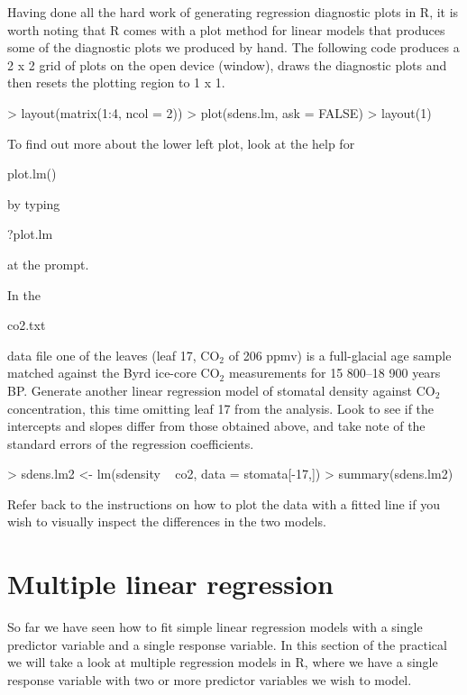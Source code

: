 \documentclass[letterpaper,10pt]{article}
\newenvironment{rline}{\begin{small}\begin{ttfamily}}{\end{ttfamily}\end{small}}
\begin{document}
Having done all the hard work of generating regression diagnostic plots in R, it is worth noting that R comes with a plot method for linear models that produces some of the diagnostic plots we produced by hand. The following code produces a 2 x 2 grid of plots on the open device (window), draws the diagnostic plots and then resets the plotting region to 1 x 1.

\begin{Schunk}
\begin{Sinput}
> layout(matrix(1:4, ncol = 2))
> plot(sdens.lm, ask = FALSE)
> layout(1)
\end{Sinput}
\end{Schunk}

To find out more about the lower left plot, look at the help for \begin{rline}plot.lm()\end{rline} by typing \begin{rline}?plot.lm\end{rline} at the prompt.

In the \begin{rline}co2.txt\end{rline} data file one of the leaves (leaf 17, $\mathrm{CO}_2$ of 206 ppmv) is a full-glacial age sample matched against the Byrd ice-core $\mathrm{CO}_2$ measurements for 15 800--18 900 years BP. Generate another linear regression model of stomatal density against $\mathrm{CO}_2$ concentration, this time omitting leaf 17 from the analysis. Look to see if the intercepts and slopes differ from those obtained above, and take note of the standard errors of the regression coefficients.

\begin{Schunk}
\begin{Sinput}
> sdens.lm2 <- lm(sdensity ~ co2, data = stomata[-17,])
> summary(sdens.lm2)
\end{Sinput}
\end{Schunk}

Refer back to the instructions on how to plot the data with a fitted line if you wish to visually inspect the differences in the two models.

\section{Multiple linear regression}
So far we have seen how to fit simple linear regression models with a single predictor variable and a single response variable. In this section of the practical we will take a look at multiple regression models in R, where we have a single response variable with two or more predictor variables we wish to model.
\end{document}

